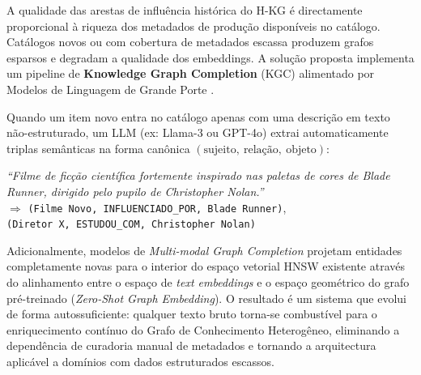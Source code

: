\documentclass[11pt,a4paper]{article}
\begin{document}
A qualidade das arestas de influência histórica do H-KG é directamente proporcional à riqueza dos
metadados de produção disponíveis no catálogo. Catálogos novos ou com cobertura de metadados
escassa produzem grafos esparsos e degradam a qualidade dos embeddings. A solução proposta
implementa um pipeline de \textbf{Knowledge Graph Completion} (KGC) alimentado por Modelos de
Linguagem de Grande Porte \cite{llm_kgc}.

Quando um item novo entra no catálogo apenas com uma descrição em texto não-estruturado, um LLM
(ex: Llama-3 ou GPT-4o) extrai automaticamente triplas semânticas na forma canônica
$(\text{sujeito},\ \text{relação},\ \text{objeto})$:

\begin{center}
\small
\textit{``Filme de ficção científica fortemente inspirado nas paletas de cores de Blade Runner,
dirigido pelo pupilo de Christopher Nolan.''}\\[4pt]
$\Rightarrow$ \texttt{(Filme Novo,\ INFLUENCIADO\_POR,\ Blade Runner)},\\
\texttt{(Diretor X,\ ESTUDOU\_COM,\ Christopher Nolan)}
\end{center}

Adicionalmente, modelos de \textit{Multi-modal Graph Completion} projetam entidades completamente
novas para o interior do espaço vetorial HNSW existente através do alinhamento entre o espaço de
\textit{text embeddings} e o espaço geométrico do grafo pré-treinado (\textit{Zero-Shot Graph
Embedding}). O resultado é um sistema que evolui de forma autossuficiente: qualquer texto bruto
torna-se combustível para o enriquecimento contínuo do Grafo de Conhecimento Heterogêneo,
eliminando a dependência de curadoria manual de metadados e tornando a arquitectura aplicável a
domínios com dados estruturados escassos.

\end{document}
